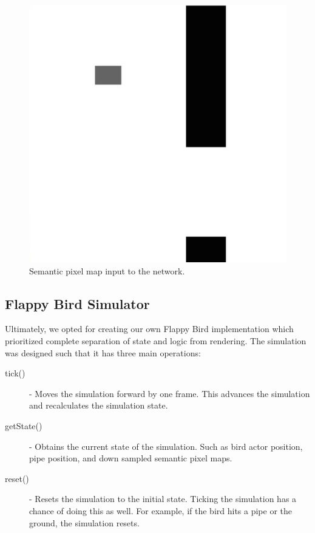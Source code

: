 \documentclass{chi2009}
\begin{document}
\begin{figure}[t]
\begin{center}
\includegraphics[width=0.8\columnwidth]{figs/conv.jpg}
\vspace*{-0.05in}
\caption{Semantic pixel map input to the network.}
\label{fig:flappy_game}
\end{center}
\end{figure}

\subsection{Flappy Bird Simulator}

Ultimately, we opted for creating our own Flappy Bird implementation which prioritized complete separation of state and logic from rendering. The simulation was designed such that it has three main operations:

\begin{description}
    \item[tick()] - Moves the simulation forward by one frame. This advances the simulation and recalculates the simulation state.
    \item[getState()] -  Obtains the current state of the simulation. Such as bird actor position, pipe position, and down sampled semantic pixel maps.
    \item[reset()] - Resets the simulation to the initial state. Ticking the simulation has a chance of doing this as well. For example, if the bird hits a pipe or the ground, the simulation resets.
\end{description}
\end{document}
